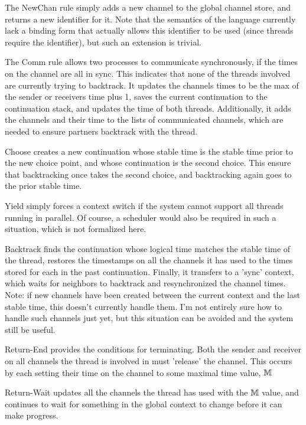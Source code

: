 \documentclass[9pt]{article}
\begin{document}
  \SyntaxFigure

  \SemanticsFigure

\clearpage 

  The NewChan rule simply adds a new channel to the global channel
  store, and returns a new identifier for it. Note that the semantics of
  the language currently lack a binding form that actually allows this
  identifier to be used (since threads require the identifier), but such
  an extension is trivial. 

  The Comm rule allows two processes to communicate synchronously, if
  the times on the channel are all in sync. This indicates that none of
  the threads involved are currently trying to backtrack. It updates the
  channels times to be the max of the sender or receivers time plus 1,
  saves the current continuation to the continuation stack, and updates
  the time of both threads. Additionally, it adds the channels and their
  time to the lists of communicated channels, which are needed to ensure
  partners backtrack with the thread.

  Choose creates a new continuation whose stable time is the stable time
  prior to the new choice point, and whose continuation is the second
  choice. This ensure that backtracking once takes the second choice,
  and backtracking again goes to the prior stable time.

  Yield simply forces a context switch if the system cannot support all
  threads running in parallel. Of course, a scheduler would also be
  required in such a situation, which is not formalized here.

  Backtrack finds the continuation whose logical time matches the stable
  time of the thread, restores the timestamps on all the
  channels it has used to the times stored for each in the past
  continuation.  Finally, it transfers to a 'sync' context, which waits
  for neighbors to backtrack and resynchronized the channel times.  
  Note: if new channels have been created between the current context
  and the last stable time, this doesn't currently handle them. I'm not
  entirely sure how to handle such channels just yet, but this situation
  can be avoided and the system still be useful.

  Return-End provides the conditions for terminating. Both the sender
  and receiver on all channels the thread is involved in must 'release'
  the channel. This occurs by each setting their time on the channel to
  some maximal time value, $\mathbb{M}$

  Return-Wait updates all the channels the thread has used with the
  $\mathbb{M}$ value, and continues to wait for something in the global
  context to change before it can make progress.
\end{document}
